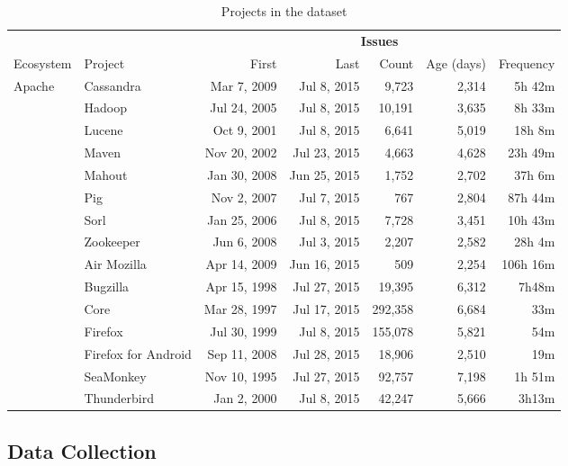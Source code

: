 \begin{table*}[h]
\begin{center}
\caption{Projects in the dataset}\label{tab:dataset-projects}
\begin{tabular}{l|l|rrrrr}
 &               & \multicolumn{5}{c}{{\bf Issues}} \\
Ecosystem & Project & First & Last & Count & Age (days) & Frequency \\
\hline
\multirow{9}{*}{Apache}
 & Cassandra & Mar 7, 2009 & Jul 8, 2015 & 9,723 & 2,314 & 5h 42m \\
 & Hadoop & Jul 24, 2005 & Jul 8, 2015 & 10,191 & 3,635 & 8h 33m \\
 & Lucene & Oct 9, 2001 & Jul 8, 2015 & 6,641 & 5,019 & 18h 8m \\
 & Maven & Nov 20, 2002 & Jul 23, 2015 & 4,663 & 4,628 & 23h 49m \\
 & Mahout & Jan 30, 2008 & Jun 25, 2015 & 1,752 & 2,702 & 37h 6m \\
 & Pig & Nov 2, 2007 & Jul 7, 2015 & 767 & 2,804 & 87h 44m \\
 & Sorl & Jan 25, 2006 & Jul 8, 2015 & 7,728 & 3,451 & 10h 43m \\
 & Zookeeper & Jun 6, 2008 & Jul 3, 2015 & 2,207 & 2,582 & 28h 4m \\
\hline
\multirow{6}{*}{Mozilla}
 & Air Mozilla & Apr 14, 2009 & Jun 16, 2015 & 509 & 2,254 & 106h 16m \\
 & Bugzilla & Apr 15, 1998 & Jul 27, 2015 & 19,395 & 6,312 & 7h48m \\
 & Core & Mar 28, 1997 & Jul 17, 2015 & 292,358 & 6,684 & 33m \\
 & Firefox & Jul 30, 1999 & Jul 8, 2015 & 155,078 & 5,821 & 54m \\
 & Firefox for Android & Sep 11, 2008 & Jul 28, 2015 & 18,906 & 2,510 & 19m \\
 & SeaMonkey & Nov 10, 1995 & Jul 27, 2015 & 92,757 & 7,198 & 1h 51m \\
 & Thunderbird & Jan 2, 2000 & Jul 8, 2015 & 42,247 & 5,666 & 3h13m\\\hline
\end{tabular}
\label{tab:dataset-projects}
\end{center}
\end{table*}


\subsection{Data Collection} \label{sec:collection}

